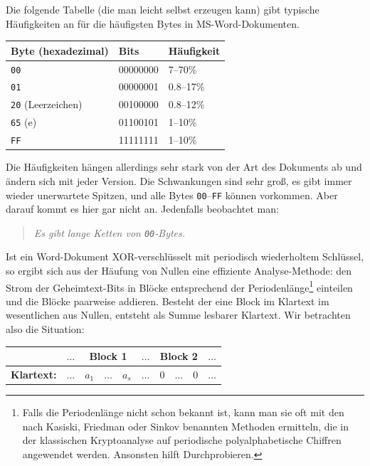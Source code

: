 \begin{refsegment}
Die folgende Tabelle (die man leicht selbst erzeugen kann) gibt
typische Häufigkeiten an für die häufigsten Bytes
in MS-Word-Dokumenten.
\begin{center}
\begin{tabular}{|l|l|l|} \hline
   \textbf{Byte} (hexadezimal) & \textbf{Bits} & \textbf{Häufigkeit} \\ \hline
   {\tt 00}                 & 00000000   & 7--70\%          \\
   {\tt 01}                 & 00000001   & 0.8--17\%        \\
   {\tt 20} (Leerzeichen)   & 00100000   & 0.8--12\%        \\
   {\tt 65} (e)             & 01100101   & 1--10\%          \\
   {\tt FF}                 & 11111111   & 1--10\%          \\ \hline
\end{tabular}
\end{center}
Die Häufigkeiten hängen allerdings sehr stark von der Art des Dokuments ab und
ändern sich mit jeder Version. Die Schwankungen sind sehr groß, es gibt immer
wieder unerwartete Spitzen, und alle Bytes {\tt 00}--{\tt FF} können vorkommen.
Aber darauf kommt es hier gar nicht an. Jedenfalls beobachtet man:
\begin{quote}
   {\em Es gibt lange Ketten von {\tt 00}-Bytes.}
\end{quote}
Ist ein Word-Dokument XOR-verschlüsselt mit periodisch wiederholtem Schlüssel,
so ergibt sich aus der Häufung von Nullen eine effiziente Analyse-Methode:
den Strom der Geheimtext-Bits in Blöcke entsprechend der Periodenlänge\footnote{%
  Falls die Periodenlänge nicht schon bekannt ist, kann man sie oft mit
  den nach Kasiski, Friedman oder Sinkov benannten Methoden ermitteln,
  die in der klassischen Kryptoanalyse auf periodische polyalphabetische
  Chiffren angewendet werden. Ansonsten hilft Durchprobieren.
} einteilen
und die Blöcke paarweise addieren. Besteht der eine Block im Klartext im wesentlichen
aus Nullen, entsteht als Summe lesbarer Klartext. Wir betrachten also
die Situation:
\begin{center}
\begin{tabular}{rc|ccc|c|ccc|c}
                     & $\ldots$ & \multicolumn{3}{c|}{Block 1} & $\ldots$ & \multicolumn{3}{c|}{Block 2} & $\ldots$ \\
\hline
   \textbf{Klartext:}   & $\ldots$ & $a_1$ & $\ldots$ & $a_s$     & $\ldots$ & $0$    & $\ldots$ & $0$      & $\ldots$ \\

\end{tabular}
\end{center}
\end{refsegment}

